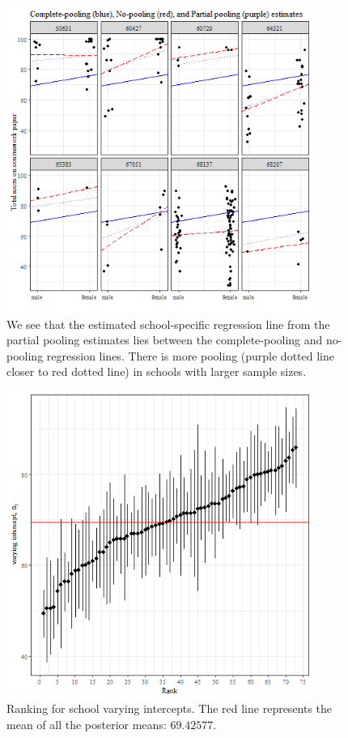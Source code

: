 \begin{figure}
	\centering
	\includegraphics[width=10cm,height=10cm,keepaspectratio]{graphics/pooling.png}
	\caption{We see that the estimated school-specific regression line from the partial pooling estimates lies between the complete-pooling and no-pooling regression lines. There is more pooling (purple dotted line closer to red dotted line) in schools with larger sample sizes.}
	\label{fig:pooling}
\end{figure}

\begin{figure}
	\centering
	\includegraphics[width=10cm,height=10cm,keepaspectratio]{./graphics/ranking.png}
	\caption{Ranking for school varying intercepts. The red line represents the mean of all the posterior means: $69.42577$.}
	\label{fig:ranking}
\end{figure}

